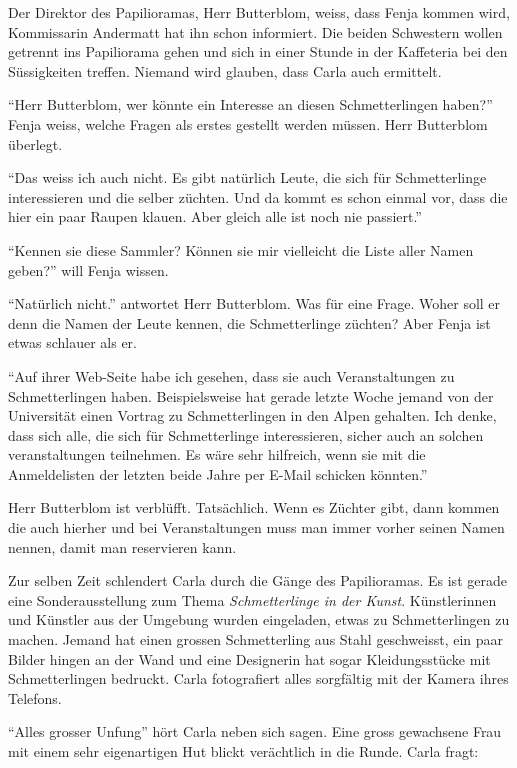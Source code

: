 Der Direktor des Papilioramas, Herr Butterblom, weiss, dass Fenja kommen wird, Kommissarin Andermatt hat ihn schon informiert. Die beiden Schwestern wollen getrennt ins Papiliorama gehen und sich in einer Stunde in der Kaffeteria bei den Süssigkeiten treffen. Niemand wird glauben, dass Carla auch ermittelt.


\enquote{Herr Butterblom, wer könnte ein Interesse an diesen Schmetterlingen haben?} Fenja weiss, welche Fragen als erstes gestellt werden müssen. Herr Butterblom überlegt.

\enquote{Das weiss ich auch nicht. Es gibt natürlich Leute, die sich für Schmetterlinge interessieren und die selber züchten. Und da kommt es schon einmal vor, dass die hier ein paar Raupen klauen. Aber gleich alle ist noch nie passiert.} 

\enquote{Kennen sie diese Sammler? Können sie mir vielleicht die Liste aller Namen geben?} will Fenja wissen.

\enquote{Natürlich nicht.} antwortet Herr Butterblom. Was für eine Frage. Woher soll er denn die Namen der Leute kennen, die Schmetterlinge züchten? Aber Fenja ist etwas schlauer als er.

\enquote{Auf ihrer Web-Seite habe ich gesehen, dass sie auch Veranstaltungen zu Schmetterlingen haben. Beispielsweise hat gerade letzte Woche jemand von der Universität einen Vortrag zu Schmetterlingen in den Alpen gehalten. Ich denke, dass sich alle, die sich für Schmetterlinge interessieren, sicher auch an solchen veranstaltungen teilnehmen. Es wäre sehr hilfreich, wenn sie mit die Anmeldelisten der letzten beide Jahre per E-Mail schicken könnten.}

Herr Butterblom ist verblüfft. Tatsächlich. Wenn es Züchter gibt, dann kommen die auch hierher und bei Veranstaltungen muss man immer vorher seinen Namen nennen, damit man reservieren kann. 

Zur selben Zeit schlendert Carla durch die Gänge des Papilioramas. Es ist gerade eine Sonderausstellung zum Thema \emph{Schmetterlinge in der Kunst}. Künstlerinnen und Künstler aus der Umgebung wurden eingeladen, etwas zu Schmetterlingen zu machen. Jemand hat einen grossen Schmetterling aus Stahl geschweisst, ein paar Bilder hingen an der Wand und eine Designerin hat sogar Kleidungsstücke mit Schmetterlingen bedruckt. Carla fotografiert alles sorgfältig mit der Kamera ihres Telefons.

\enquote{Alles grosser Unfung} hört Carla neben sich sagen. Eine gross gewachsene Frau mit einem sehr eigenartigen Hut blickt verächtlich in die Runde. Carla fragt:


